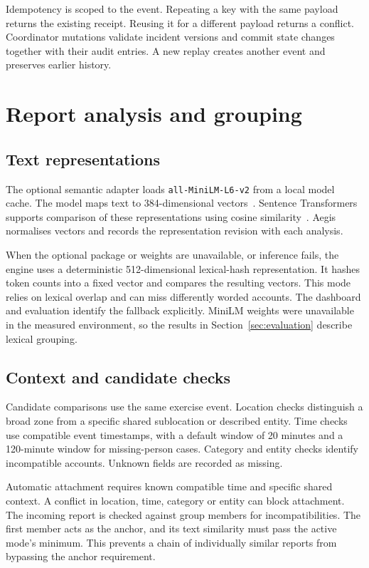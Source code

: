 \documentclass[11pt,a4paper]{article}
\begin{document}
Idempotency is scoped to the event. Repeating a key with the same payload returns the existing receipt. Reusing it for a different payload returns a conflict. Coordinator mutations validate incident versions and commit state changes together with their audit entries. A new replay creates another event and preserves earlier history.

\section{Report analysis and grouping}
\subsection{Text representations}
The optional semantic adapter loads \texttt{all-MiniLM-L6-v2} from a local model cache. The model maps text to 384-dimensional vectors~\cite{minilm}. Sentence Transformers supports comparison of these representations using cosine similarity~\cite{sts}. Aegis normalises vectors and records the representation revision with each analysis.

When the optional package or weights are unavailable, or inference fails, the engine uses a deterministic 512-dimensional lexical-hash representation. It hashes token counts into a fixed vector and compares the resulting vectors. This mode relies on lexical overlap and can miss differently worded accounts. The dashboard and evaluation identify the fallback explicitly. MiniLM weights were unavailable in the measured environment, so the results in Section~\ref{sec:evaluation} describe lexical grouping.

\subsection{Context and candidate checks}
Candidate comparisons use the same exercise event. Location checks distinguish a broad zone from a specific shared sublocation or described entity. Time checks use compatible event timestamps, with a default window of 20 minutes and a 120-minute window for missing-person cases. Category and entity checks identify incompatible accounts. Unknown fields are recorded as missing.

Automatic attachment requires known compatible time and specific shared context. A conflict in location, time, category or entity can block attachment. The incoming report is checked against group members for incompatibilities. The first member acts as the anchor, and its text similarity must pass the active mode's minimum. This prevents a chain of individually similar reports from bypassing the anchor requirement.
\end{document}
